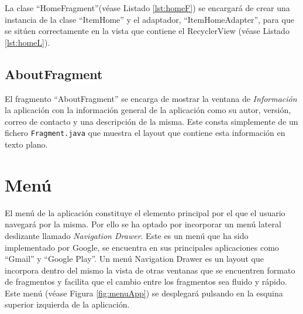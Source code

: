     
% 




\bigskip
La clase ``HomeFragment''(véase Listado \ref{lst:homeF}) se encargará de crear una instancia de la clase ``ItemHome'' y el adaptador, ``ItemHomeAdapter'', para que se sitúen correctamente en la vista que contiene el RecyclerView (véase Listado \ref{lst:homeL}). 


  


\subsection{AboutFragment}

El fragmento ``AboutFragment'' se encarga de mostrar la ventana de \textit{Información} la aplicación con la información general de la aplicación como su autor, versión, correo de contacto y una descripción de la misma. Este consta simplemente de un fichero \texttt{Fragment.java} que muestra el layout que contiene esta información en texto plano.

% 

\section{Menú}

El menú de la aplicación constituye el elemento principal por el que el usuario navegará por la misma. Por ello se ha optado por incorporar un menú lateral deslizante llamado \textit{Navigation Drawer}. Este es un menú que ha sido implementado por Google, se encuentra en sus principales aplicaciones como ``Gmail'' y ``Google Play''. Un menú Navigation Drawer es un layout que incorpora dentro del mismo la vista de otras ventanas que se encuentren formato de fragmentos y facilita que el cambio entre los fragmentos sea fluido y rápido. Este menú (véase Figura \ref{fig:menuApp}) se desplegará pulsando en la esquina superior izquierda de la aplicación.
   
